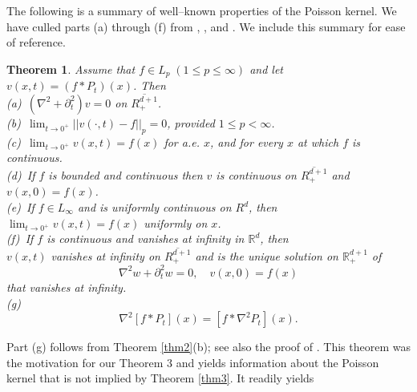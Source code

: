 \documentclass[english, reqno]{amsart}
\newtheorem{thm}{Theorem}[]
\newcommand{\del}{\mbox{$\partial$}}
\newcommand{\IR}{\text{${\mathbb{R}}$}}
\begin{document}
The following is a summary of well--known properties of  the Poisson kernel.  We have culled parts (a) through (f) from \cite[Theorem 2.44]{Fo}, \cite[Theorem 2.45]{Fo}, and \cite[Theorem 8.14]{Fo1}. We include this summary for ease of reference. 
\begin{thm} \label{thm5}
Assume that $f \in L_p \; ( 1\le p \le \infty)$ and let $v(x,t)=(f\ast P_t)(x)$. Then\\
\noindent\textup(a)\ \quad$(\nabla^2 +\del_t^2)v=0 $ on $\overline{R_+^{d+1}}$. \\
\textup(b)\ \quad $\lim_{t \rightarrow 0^+} ||v(\cdot, t) - f||_p=0$, provided $1\le p < \infty$.\\
\textup(c)\ \quad $\lim_{t \rightarrow 0^+} v(x, t) = f(x)$ for a.e. $x$, and for every $x$ at which $f$ is continuous.\\
\textup(d)\ \quad If $f$ is bounded and continuous then $v$ is continuous on $\overline{R_+^{d+1}}$ and\\
 \indent\indent $v(x,0)=f(x)$.\\
\textup(e)\ \quad If $f \in L_{\infty}$ and is uniformly continuous on $R^d$, then $\lim_{t \rightarrow 0^+} v(x, t) = f(x)$ 
\indent\indent uniformly on $x$.\\
\textup(f)\ \quad If $f$ is continuous and vanishes at infinity in $\IR^d$, then \\
\indent\indent$v(x,t)$ vanishes at infinity on $\overline{R_+^{d+1}}$ and is the unique solution on $\IR_+^{d+1}$ of
\[
\nabla^2 w+\del^2_t w=0, \quad v(x,0)=f(x)
\]
\quad\quad that vanishes at infinity.\\
\textup(g)\ 
\[
\nabla^2[f\ast P_t](x)= [f \ast \nabla^2 P_t](x).
\]
\end{thm}
Part (g)  follows from Theorem \ref{thm2}(b); see also the proof of \cite[Theorem 8.53]{Fo1}.
This theorem was the motivation for our Theorem 3 and yields information about the Poisson kernel that is not implied by Theorem \ref{thm3}.
It readily yields
\end{document}
